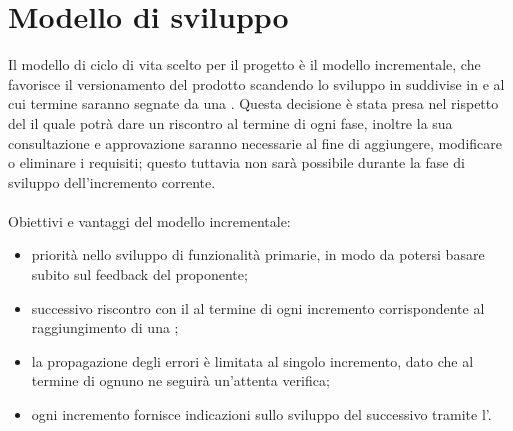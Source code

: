 \section{Modello di sviluppo}

	Il modello di ciclo di vita scelto per il progetto è il modello incrementale, che favorisce il versionamento del prodotto scandendo lo sviluppo in  suddivise in  e  al cui termine saranno segnate da una .
	Questa decisione è stata presa nel rispetto del  il quale potrà dare un riscontro al termine di ogni fase, inoltre la sua consultazione e approvazione saranno necessarie al fine di aggiungere, modificare o eliminare i requisiti; questo tuttavia non sarà possibile durante la fase di sviluppo dell’incremento corrente. 
	\\
	\\
	Obiettivi e vantaggi del modello incrementale:
	\begin{itemize}
		\item priorità nello sviluppo di funzionalità primarie, in modo da potersi basare subito sul feedback del proponente;
		\item successivo riscontro con il  al termine di ogni incremento corrispondente al raggiungimento di una ;
		\item la propagazione degli errori è limitata al singolo incremento, dato che al termine di ognuno ne seguirà un’attenta verifica;
		\item ogni incremento fornisce indicazioni sullo sviluppo del successivo tramite l’.
	\end{itemize}

\newpage